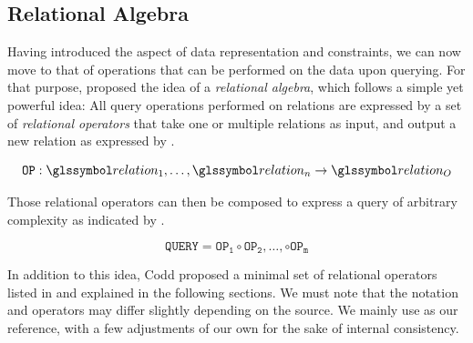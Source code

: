\subsection{Relational Algebra}
\label{section:rel_algebra}

Having introduced the aspect of data representation and constraints, we can now move to that of operations that can be performed on the data upon querying. For that purpose, \cite{Codd:1970Relational} proposed the idea of a \emph{relational algebra}, which follows a simple yet powerful idea: All query operations performed on relations are expressed by a set of \emph{relational operators} that take one or multiple relations as input, and output a new relation as expressed by .

\begin{equation}
    \label{equation:rel_op}
    \mathtt{OP}: \relation_1, \ldots, \relation_n \rightarrow \relation_{O}
\end{equation}

Those relational operators can then be composed to express a query of arbitrary complexity as indicated by .

\begin{equation}
    \label{equation:rel_query}
    \mathtt{QUERY} = \mathtt{OP_{1}} \circ \mathtt{OP_{2}}, \ldots , \circ \mathtt{OP_{m}}
\end{equation}

In addition to this idea, Codd proposed a minimal set of relational operators listed in  and explained in the following sections. We must note that the notation and operators may differ slightly depending on the source. We mainly use \cite{Garcia:2009Database} as our reference, with a few adjustments of our own for the sake of internal consistency.

